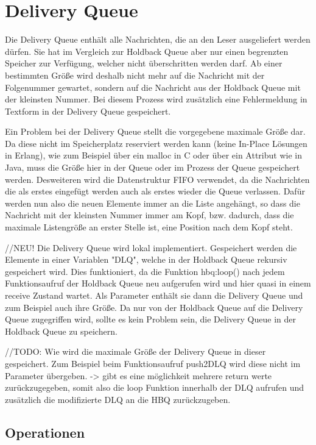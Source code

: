 \section{Delivery Queue}

Die Delivery Queue enthält alle Nachrichten, die an den Leser ausgeliefert werden dürfen. Sie hat im Vergleich zur Holdback Queue aber nur einen begrenzten Speicher zur Verfügung, welcher nicht überschritten werden darf. Ab einer bestimmten Größe wird deshalb nicht mehr auf die Nachricht mit der Folgenummer gewartet, sondern auf die Nachricht aus der Holdback Queue mit der kleinsten Nummer. Bei diesem Prozess wird zusätzlich eine Fehlermeldung in Textform in der Delivery Queue gespeichert. 

Ein Problem bei der Delivery Queue stellt die vorgegebene maximale Größe dar. Da diese nicht im Speicherplatz reserviert werden kann (keine In-Place Lösungen in Erlang), wie zum Beispiel über ein malloc in C oder über ein Attribut wie in Java, muss die Größe hier in der Queue oder im Prozess der Queue gespeichert werden. 
Desweiteren wird die Datenstruktur FIFO verwendet, da die Nachrichten die als erstes eingefügt werden auch als erstes wieder die Queue verlassen. Dafür werden nun also die neuen Elemente immer an die Liste angehängt, so dass die Nachricht mit der kleinsten Nummer immer am Kopf, bzw. dadurch, dass die maximale Listengröße an erster Stelle ist, eine Position nach dem Kopf steht. 

//NEU!
Die Delivery Queue wird lokal implementiert. Gespeichert werden die Elemente in einer Variablen "DLQ", welche in der Holdback Queue rekursiv gespeichert wird. Dies funktioniert, da die Funktion hbq:loop() nach jedem Funktionsaufruf der Holdback Queue neu aufgerufen wird und hier quasi in einem receive Zustand wartet. Als Parameter enthält sie dann die Delivery Queue und zum Beispiel auch ihre Größe. Da nur von der Holdback Queue auf die Delivery Queue zugegriffen wird, sollte es kein Problem sein, die Delivery Queue in der Holdback Queue zu speichern. 

//TODO: Wie wird die maximale Größe der Delivery Queue in dieser gespeichert. Zum Beispiel beim Funktionsaufruf push2DLQ wird diese nicht im Parameter übergeben.
-> gibt es eine möglichkeit mehrere return werte zurückzugegeben, somit also die loop Funktion innerhalb der DLQ aufrufen und zusätzlich die modifizierte DLQ an die HBQ zurückzugeben. 

\subsection{Operationen}

